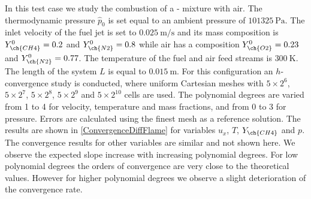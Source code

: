 In this test case we study the combustion of a - mixture with air. The thermodynamic pressure $\hat p_0$ is set equal to an ambient pressure of $\SI{101325}{\pascal}$. The inlet velocity of the fuel jet is set to $\SI{0.025}{\meter \per \second}$ and its mass composition is $Y^0_{\ch{CH4}} = 0.2$ and $Y^0_{\ch{N2}} = 0.8$ while air has a composition $Y^0_{\ch{O2}} = 0.23$ and $Y^0_{\ch{N2}} = 0.77$. The temperature of the fuel and air feed streams is $\SI{300}{\kelvin}$. The length of the system $L$ is equal to $\SI{0.015}{\meter}$.
For this configuration an $h$-convergence study is conducted, where uniform Cartesian meshes with  $5\times2^6$, $5\times2^7$, $5\times2^8$,  $5\times2^9$ and $5\times2^{10}$  cells are used. The polynomial degrees are varied from 1 to 4 for velocity, temperature and mass fractions, and from 0 to 3 for pressure.  Errors are calculated using the finest mesh as a reference solution.  The results are shown in \cref{ConvergenceDiffFlame} for variables $u_x$, $T$, $Y_{\ch{CH4}}$ and $p$. The convergence results for other variables are similar and not shown here. We observe the expected slope increase with increasing polynomial degrees. For low polynomial degrees the orders of convergence are very close to the theoretical values. However for higher polynomial degrees we observe a slight deterioration of the convergence rate.  
\FloatBarrier
	
